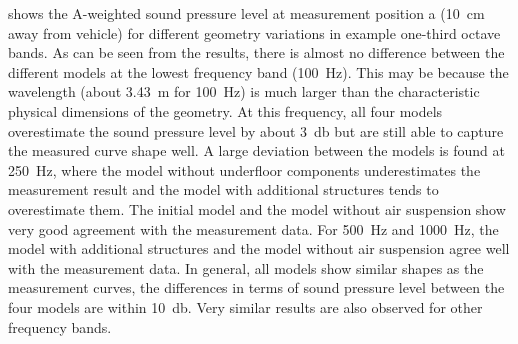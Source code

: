  shows the A-weighted sound pressure level at measurement position a (\SI{10}{\centi\meter} away from vehicle) for different geometry variations in example one-third octave bands. As can be seen from the results, there is almost no difference between the different models at the lowest frequency band (\SI{100}{\hertz}). This may be because the wavelength (about \SI{3.43}{\meter} for \SI{100}{\hertz}) is much larger than the characteristic physical dimensions of the geometry. At this frequency, all four models overestimate the sound pressure level by about \SI{3}{\decibel} but are still able to capture the measured curve shape well. A large deviation between the models is found at \SI{250}{\hertz}, where the model without underfloor components underestimates the measurement result and the model with additional structures tends to overestimate them. The initial model and the model without air suspension show very good agreement with the measurement data. For \SI{500}{\hertz} and \SI{1000}{\hertz}, the model with additional structures and the model without air suspension agree well with the measurement data. In general, all models show similar shapes as the measurement curves, the differences in terms of sound pressure level between the four models are within \SI{10}{\decibel}. Very similar results are also observed for other frequency bands.

